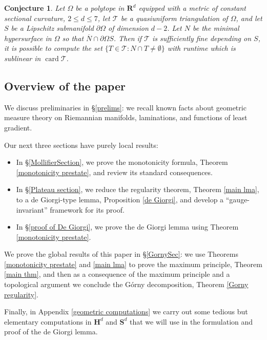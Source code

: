 \documentclass[reqno,10pt]{amsart}
\newcommand{\RR}{\mathbf{R}}
\newcommand{\Hyp}{\mathbf H}
\newcommand{\Sph}{\mathbf S}
\DeclareMathOperator{\card}{card}
\newtheorem{conjecture}[theorem]{Conjecture}
\theoremstyle{definition}
\numberwithin{equation}{section}
\begin{document}
\begin{conjecture}
Let $\Omega$ be a polytope in $\RR^d$ equipped with a metric of constant sectional curvature, $2 \leq d \leq 7$, let $\mathcal T$ be a quasiuniform triangulation of $\Omega$, and let $S$ be a Lipschitz submanifold $\partial \Omega$ of dimension $d - 2$.
Let $N$ be the minimal hypersurface in $\Omega$ so that $\overline N \cap \partial \Omega S$.
Then if $\mathcal T$ is sufficiently fine depending on $S$, it is possible to compute the set $\{T \in \mathcal T: N \cap T \neq \emptyset\}$ with runtime which is sublinear in $\card \mathcal T$.
\end{conjecture}


\subsection{Overview of the paper}
We discuss preliminaries in \S\ref{prelims}: we recall known facts about geometric measure theory on Riemannian manifolds, laminations, and functions of least gradient.

Our next three sections have purely local results:
\begin{itemize}
\item In \S\ref{MollifierSection}, we prove the monotonicity formula, Theorem \ref{monotonicity prestate}, and review its standard consequences.
\item In \S\ref{Plateau section}, we reduce the regularity theorem, Theorem \ref{main lma}, to a de Giorgi-type lemma, Proposition \ref{de Giorgi}, and develop a ``gauge-invariant'' framework for its proof.
\item In \S\ref{proof of De Giorgi}, we prove the de Giorgi lemma using Theorem \ref{monotonicity prestate}.
\end{itemize}

We prove the global results of this paper in \S\ref{GornySec}: we use Theorems \ref{monotonicity prestate} and \ref{main lma} to prove the maximum principle, Theorem \ref{main thm}, and then as a consequence of the maximum principle and a topological argument we conclude the G\'orny decomposition, Theorem \ref{Gorny regularity}.

Finally, in Appendix \ref{geometric computations} we carry out some tedious but elementary computations in $\Hyp^d$ and $\Sph^d$ that we will use in the formulation and proof of the de Giorgi lemma.

\end{document}
